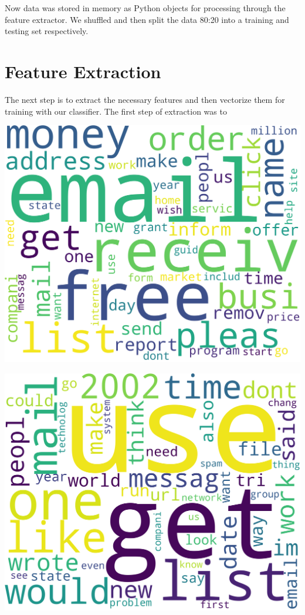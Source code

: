 \documentclass[12pt]{article}
\begin{document}
\begin{multicols}{2}
            Now data was stored in memory as Python objects for processing through the
            feature extractor. We shuffled and then split the data 
            80:20 into a training and testing set respectively.
        
        \section{Feature Extraction}

            The next step is to extract the necessary features and then vectorize
            them for training with our classifier. The first step of extraction was
            to


            \begin{minipage}{0.4\columnwidth}
                \includegraphics[width=\textwidth]{figures/spam_wc}
                \label{spam_wc}
            \end{minipage}
            \begin{minipage}{0.4\columnwidth}
                \includegraphics[width=\textwidth]{figures/ham_wc}

\end{minipage}
\end{multicols}
\end{document}
